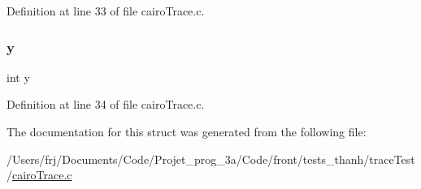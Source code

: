 Definition at line 33 of file cairo\+Trace.\+c.

\hypertarget{structpoint_a0a2f84ed7838f07779ae24c5a9086d33}{}\label{structpoint_a0a2f84ed7838f07779ae24c5a9086d33} 
\subsubsection{\texorpdfstring{y}{y}}
{\footnotesize\ttfamily int y}



Definition at line 34 of file cairo\+Trace.\+c.



The documentation for this struct was generated from the following file\+:\begin{DoxyCompactItemize}
\item 
/\+Users/frj/\+Documents/\+Code/\+Projet\+\_\+prog\+\_\+3a/\+Code/front/tests\+\_\+thanh/trace\+Test/\hyperlink{cairo_trace_8c}{cairo\+Trace.\+c}\end{DoxyCompactItemize}
